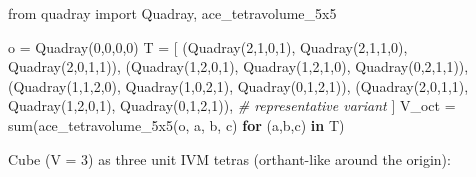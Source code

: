\documentclass[
  10pt,
]{article}
\newenvironment{Shaded}{}{}
\newcommand{\BuiltInTok}[1]{#1}
\newcommand{\CommentTok}[1]{\textcolor[rgb]{0.38,0.63,0.69}{\textit{#1}}}
\newcommand{\ControlFlowTok}[1]{\textcolor[rgb]{0.00,0.44,0.13}{\textbf{#1}}}
\newcommand{\DecValTok}[1]{\textcolor[rgb]{0.25,0.63,0.44}{#1}}
\newcommand{\ImportTok}[1]{#1}
\newcommand{\KeywordTok}[1]{\textcolor[rgb]{0.00,0.44,0.13}{\textbf{#1}}}
\newcommand{\NormalTok}[1]{#1}
\newcommand{\OperatorTok}[1]{\textcolor[rgb]{0.40,0.40,0.40}{#1}}
\begin{document}
\begin{Shaded}
\begin{Highlighting}[]
\ImportTok{from}\NormalTok{ quadray }\ImportTok{import}\NormalTok{ Quadray, ace\_tetravolume\_5x5}

\NormalTok{o }\OperatorTok{=}\NormalTok{ Quadray(}\DecValTok{0}\NormalTok{,}\DecValTok{0}\NormalTok{,}\DecValTok{0}\NormalTok{,}\DecValTok{0}\NormalTok{)}
\NormalTok{T }\OperatorTok{=}\NormalTok{ [}
\NormalTok{    (Quadray(}\DecValTok{2}\NormalTok{,}\DecValTok{1}\NormalTok{,}\DecValTok{0}\NormalTok{,}\DecValTok{1}\NormalTok{), Quadray(}\DecValTok{2}\NormalTok{,}\DecValTok{1}\NormalTok{,}\DecValTok{1}\NormalTok{,}\DecValTok{0}\NormalTok{), Quadray(}\DecValTok{2}\NormalTok{,}\DecValTok{0}\NormalTok{,}\DecValTok{1}\NormalTok{,}\DecValTok{1}\NormalTok{)),}
\NormalTok{    (Quadray(}\DecValTok{1}\NormalTok{,}\DecValTok{2}\NormalTok{,}\DecValTok{0}\NormalTok{,}\DecValTok{1}\NormalTok{), Quadray(}\DecValTok{1}\NormalTok{,}\DecValTok{2}\NormalTok{,}\DecValTok{1}\NormalTok{,}\DecValTok{0}\NormalTok{), Quadray(}\DecValTok{0}\NormalTok{,}\DecValTok{2}\NormalTok{,}\DecValTok{1}\NormalTok{,}\DecValTok{1}\NormalTok{)),}
\NormalTok{    (Quadray(}\DecValTok{1}\NormalTok{,}\DecValTok{1}\NormalTok{,}\DecValTok{2}\NormalTok{,}\DecValTok{0}\NormalTok{), Quadray(}\DecValTok{1}\NormalTok{,}\DecValTok{0}\NormalTok{,}\DecValTok{2}\NormalTok{,}\DecValTok{1}\NormalTok{), Quadray(}\DecValTok{0}\NormalTok{,}\DecValTok{1}\NormalTok{,}\DecValTok{2}\NormalTok{,}\DecValTok{1}\NormalTok{)),}
\NormalTok{    (Quadray(}\DecValTok{2}\NormalTok{,}\DecValTok{0}\NormalTok{,}\DecValTok{1}\NormalTok{,}\DecValTok{1}\NormalTok{), Quadray(}\DecValTok{1}\NormalTok{,}\DecValTok{2}\NormalTok{,}\DecValTok{0}\NormalTok{,}\DecValTok{1}\NormalTok{), Quadray(}\DecValTok{0}\NormalTok{,}\DecValTok{1}\NormalTok{,}\DecValTok{2}\NormalTok{,}\DecValTok{1}\NormalTok{)),  }\CommentTok{\# representative variant}
\NormalTok{]}
\NormalTok{V\_oct }\OperatorTok{=} \BuiltInTok{sum}\NormalTok{(ace\_tetravolume\_5x5(o, a, b, c) }\ControlFlowTok{for}\NormalTok{ (a,b,c) }\KeywordTok{in}\NormalTok{ T)}
\end{Highlighting}
\end{Shaded}

Cube (V = 3) as three unit IVM tetras (orthant-like around the origin):
\end{document}
